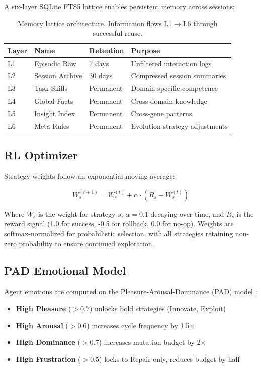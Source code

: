 \documentclass[11pt,a4paper]{article}
\begin{document}
A six-layer SQLite FTS5 lattice enables persistent memory across sessions:

\begin{table}[H]
\centering
\begin{tabular}{@{}llll@{}}
\toprule
\textbf{Layer} & \textbf{Name} & \textbf{Retention} & \textbf{Purpose} \\
\midrule
L1 & Episodic Raw & 7 days & Unfiltered interaction logs \\
L2 & Session Archive & 30 days & Compressed session summaries \\
L3 & Task Skills & Permanent & Domain-specific competence \\
L4 & Global Facts & Permanent & Cross-domain knowledge \\
L5 & Insight Index & Permanent & Cross-gene patterns \\
L6 & Meta Rules & Permanent & Evolution strategy adjustments \\
\bottomrule
\end{tabular}
\caption{Memory lattice architecture. Information flows L1$\rightarrow$L6 through successful reuse.}
\label{tab:memory}
\end{table}

\subsection{RL Optimizer}

Strategy weights follow an exponential moving average:

\begin{equation}
W_s^{(t+1)} = W_s^{(t)} + \alpha \cdot (R_s - W_s^{(t)})
\end{equation}

Where $W_s$ is the weight for strategy $s$, $\alpha = 0.1$ decaying over time, and $R_s$ is the reward signal (1.0 for success, -0.5 for rollback, 0.0 for no-op). Weights are softmax-normalized for probabilistic selection, with all strategies retaining non-zero probability to ensure continued exploration.

\subsection{PAD Emotional Model}

Agent emotions are computed on the Pleasure-Arousal-Dominance (PAD) model \cite{mehrabian1974approach}:

\begin{itemize}
    \item \textbf{High Pleasure} ($>0.7$) unlocks bold strategies (Innovate, Exploit)
    \item \textbf{High Arousal} ($>0.6$) increases cycle frequency by 1.5$\times$
    \item \textbf{High Dominance} ($>0.7$) increases mutation budget by 2$\times$
    \item \textbf{High Frustration} ($>0.5$) locks to Repair-only, reduces budget by half
\end{itemize}
\end{document}
